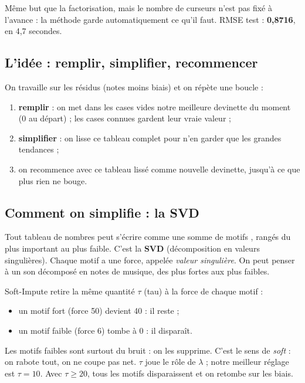 \documentclass[11pt,a4paper]{article}
\begin{document}
\begin{enbref}
Même but que la factorisation, mais le nombre de curseurs n'est pas fixé à l'avance :
la méthode garde automatiquement ce qu'il faut. RMSE test : \textbf{0,8716}, en
4,7 secondes.
\end{enbref}

\subsection{L'idée : remplir, simplifier, recommencer}

On travaille sur les résidus (notes moins biais) et on répète une boucle :
\begin{enumerate}
  \item \textbf{remplir} : on met dans les cases vides notre meilleure devinette du moment
        (0 au départ) ; les cases connues gardent leur vraie valeur ;
  \item \textbf{simplifier} : on \og lisse \fg ce tableau complet pour n'en garder que
        les grandes tendances ;
  \item on recommence avec ce tableau lissé comme nouvelle devinette, jusqu'à ce que
        plus rien ne bouge.
\end{enumerate}

\subsection{Comment on simplifie : la SVD}

Tout tableau de nombres peut s'écrire comme une somme de \og motifs \fg, rangés du plus
important au plus faible. C'est la \textbf{SVD} (décomposition en valeurs singulières).
Chaque motif a une force, appelée \emph{valeur singulière}. On peut penser à un son
décomposé en notes de musique, des plus fortes aux plus faibles.

Soft-Impute retire la même quantité $\tau$ (tau) à la force de chaque motif :
\begin{itemize}
  \item un motif fort (force 50) devient 40 : il reste ;
  \item un motif faible (force 6) tombe à 0 : il disparaît.
\end{itemize}
Les motifs faibles sont surtout du bruit : on les supprime. C'est le sens de \emph{soft} :
on rabote tout, on ne coupe pas net. $\tau$ joue le rôle de $\lambda$ ; notre meilleur
réglage est $\tau = 10$. Avec $\tau \geq 20$, tous les motifs disparaissent et on retombe
sur les biais.
\end{document}

